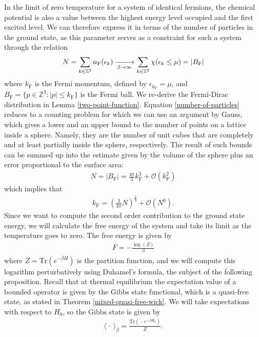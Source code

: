 In the limit of zero temperature for a system of identical fermions, the chemical potential is
also a value between the highest energy level occupied and the first excited level. We can
therefore express it in terms of the number of particles in the ground state, as this
parameter serves as a constraint for such a system through the relation
\begin{align}
	\label{number-of-particles}
	N = \sum_{k\in\mathbb{Z}^3} n_{\mathrm{F}}(\epsilon_k)
	\xlongrightarrow[\beta\to\infty]{} \sum_{k\in\mathbb{Z}^3} \chi(\epsilon_k \leq \mu)
	= \vert B_{\mathrm{F}}\vert
\end{align}
where $k_{\mathrm{F}}$ is the Fermi momentum, defined by $\epsilon_{k_{\mathrm{F}}}=\mu$,
and $B_{\mathrm{F}}=\{p\in\mathbb{Z}^3:\vert p\vert\leq k_{\mathrm{F}}\}$ is the Fermi ball.
We re-derive the Fermi-Dirac distribution in Lemma \ref{two-point-function}. Equation
\eqref{number-of-particles} reduces to a counting problem for which we can use an argument by
Gauss, which gives a lower and an upper bound to the number of points on a lattice inside a
sphere. Namely, they are the number of unit cubes that are completely and at least partially
inside the sphere, respectively. The result of such bounds can be summed up into the estimate
given by the volume of the sphere plus an error proportional to the surface area:
\begin{align*}
	N = \vert B_{\mathrm{F}}\vert
	= \frac{4\pi}{3}k_{\mathrm{F}}^3 + \mathcal{O}(k_{\mathrm{F}}^2)
\end{align*}
which implies that
\begin{align}
	\label{fermi-surface}
	k_{\mathrm{F}} = \left(\frac{3}{4\pi}N\right)^{\frac{1}{3}} + \mathcal{O}(N^0).
\end{align}
Since we want to compute the second order contribution to the ground state energy, we will
calculate the free energy of the system and take its limit as the temperature goes to zero.
The free energy is given by
\begin{align*}
	F=-\frac{\log(Z)}{\beta}
\end{align*}
where $Z=\mathrm{Tr}(e^{-\beta H})$ is the partition function, and we will compute this
logarithm perturbatively using Duhamel's formula, the subject of the following proposition.
Recall that at thermal equilibrium the expectation value of a bounded operator is given by the
Gibbs state functional, which is a quasi-free state, as stated in Theorem
\ref{mixed-quasi-free-wick}. We will take expectations with respect to $H_0$, so the Gibbs
state is given by
\begin{align*}
	\langle\,\cdot\,\rangle_\beta = \frac{\mathrm{Tr}(\,\cdot\,e^{-\beta H_0})}{Z}.
\end{align*}

